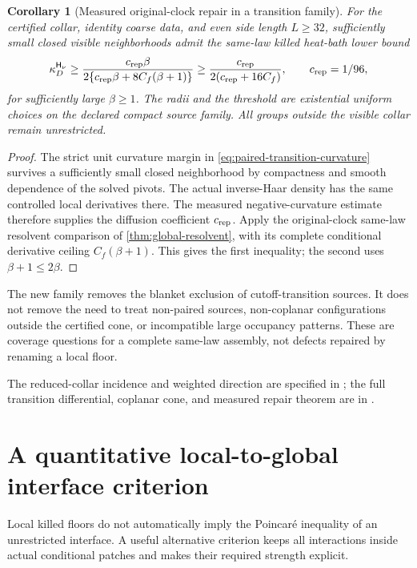 \documentclass[11pt,oneside,openany]{book}
\newtheorem{corollary}[corollary]{Corollary}
\theoremstyle{definition}
\theoremstyle{remark}
\newcommand{\src}[2]{\cite[#2]{#1}}
\newcommand{\sourcebasis}[1]{\par\smallskip\noindent #1\par}
\begin{document}
\begin{corollary}[Measured original-clock repair in a transition family]
\label{cor:paired-transition-repair}
For the certified collar, identity coarse data, and even side length
$L\ge32$, sufficiently small closed visible neighborhoods admit the
same-law killed heat-bath lower bound
\begin{equation}
 \kappa_D^{\mathsf H_\nu}
 \ge\frac{c_{\rm rep}\beta}
          {2\{c_{\rm rep}\beta+8C_f(\beta+1)\}}
 \ge\frac{c_{\rm rep}}{2(c_{\rm rep}+16C_f)},
 \qquad c_{\rm rep}=1/96,
 \label{eq:paired-transition-repair}
\end{equation}
for sufficiently large $\beta\ge1$. The radii and the threshold are
existential uniform choices on the declared compact source family.
All groups outside the visible collar remain unrestricted.
\end{corollary}
\begin{proof}
The strict unit curvature margin in
\cref{eq:paired-transition-curvature} survives a sufficiently small
closed neighborhood by compactness and smooth dependence of the
solved pivots. The actual inverse-Haar density has the same controlled
local derivatives there. The measured negative-curvature estimate
therefore supplies the diffusion coefficient $c_{\rm rep}$.
Apply the original-clock same-law resolvent comparison of
\cref{thm:global-resolvent}, with its complete conditional derivative
ceiling $C_f(\beta+1)$. This gives the first inequality; the second
uses $\beta+1\le2\beta$.
\end{proof}
The new family removes the blanket exclusion of cutoff-transition
sources. It does not remove the need to treat non-paired sources,
non-coplanar configurations outside the certified cone, or incompatible
large occupancy patterns. These are coverage questions for a complete
same-law assembly, not defects repaired by renaming a local floor.
\sourcebasis{The reduced-collar incidence and weighted direction are
specified in \src{F14}{V5--V10}; the full transition differential,
coplanar cone, and measured repair theorem are in \src{F14}{V11}.}


\section{A quantitative local-to-global interface criterion}
\label{sec:weighted-patch-criterion}
Local killed floors do not automatically imply the Poincar\'e
inequality of an unrestricted interface. A useful alternative
criterion keeps all interactions inside actual conditional patches
and makes their required strength explicit.
\end{document}

